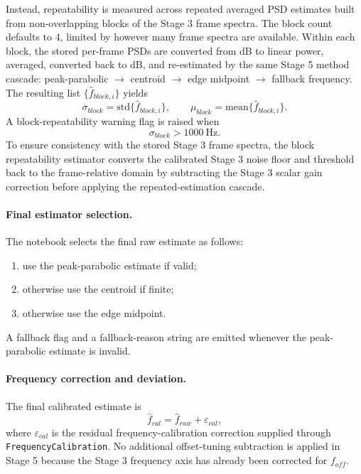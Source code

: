 \documentclass[11pt]{article}
\begin{document}
Instead, repeatability is measured across repeated averaged PSD estimates built from non-overlapping blocks of the Stage 3 frame spectra. The block count defaults to 4, limited by however many frame spectra are available. Within each block, the stored per-frame PSDs are converted from dB to linear power, averaged, converted back to dB, and re-estimated by the same Stage 5 method cascade: peak-parabolic $\rightarrow$ centroid $\rightarrow$ edge midpoint $\rightarrow$ fallback frequency. The resulting list $\{\hat{f}_{block,i}\}$ yields
\begin{equation}
\sigma_{block} = \text{std}\{\hat{f}_{block,i}\}, \qquad \mu_{block} = \text{mean}\{\hat{f}_{block,i}\}.
\end{equation}
A block-repeatability warning flag is raised when
\begin{equation}
\sigma_{block} > 1000~\text{Hz}.
\end{equation}
To ensure consistency with the stored Stage 3 frame spectra, the block repeatability estimator converts the calibrated Stage 3 noise floor and threshold back to the frame-relative domain by subtracting the Stage 3 scalar gain correction before applying the repeated-estimation cascade.

\paragraph{Final estimator selection.}
The notebook selects the final raw estimate as follows:
\begin{enumerate}
    \item use the peak-parabolic estimate if valid;
    \item otherwise use the centroid if finite;
    \item otherwise use the edge midpoint.
\end{enumerate}
A fallback flag and a fallback-reason string are emitted whenever the peak-parabolic estimate is invalid.

\paragraph{Frequency correction and deviation.}
The final calibrated estimate is
\begin{equation}
\hat{f}_{cal} = \hat{f}_{raw} + \varepsilon_{cal},
\end{equation}
where $\varepsilon_{cal}$ is the residual frequency-calibration correction supplied through \texttt{FrequencyCalibration}. No additional offset-tuning subtraction is applied in Stage 5 because the Stage 3 frequency axis has already been corrected for $f_{off}$.
\end{document}
